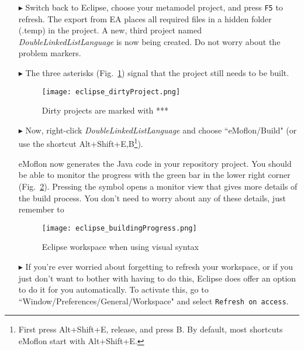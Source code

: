 \begin{itemize}
\item[$\blacktriangleright$] Switch back to Eclipse, choose your metamodel project, and press \texttt{F5} to refresh. 
The export from EA places all required files in a hidden folder (.temp) in the project.
A new, third project named \emph{DoubleLinkedListLanguage} is now being created.
Do not worry about the problem markers.

\item[$\blacktriangleright$] The three asterisks (Fig.~\ref{eclipse:dirty-project}) signal that the project still needs to be built.

\vspace{0.5cm}

\begin{figure}[htbp]
    \centering
    \texttt{[image: eclipse\_dirtyProject.png]}
    \caption{Dirty projects are marked with ***} 
    \label{eclipse:dirty-project} 
\end{figure}

\vspace{0.5cm}

\item[$\blacktriangleright$] Now, right-click \emph{DoubleLinkedListLanguage} and choose ``eMoflon/Build" (or use the shortcut Alt+Shift+E,B\footnote{First press Alt+Shift+E, release, and press B.
By default, most shortcuts eMoflon start with Alt+Shift+E.}).

eMoflon now generates the Java code in your repository project.
You should be able to monitor the progress with the green bar in the lower right corner (Fig.~\ref{eclipse:build}). Pressing the
symbol opens a monitor view that gives more details of the build process. You don't need to worry about any of these details, just remember to 


\begin{figure}[htbp]
    \centering
    \texttt{[image: eclipse\_buildingProgress.png]}
    \caption{Eclipse workspace when using visual syntax} 
    \label{eclipse:build} 
\end{figure}

\item[$\blacktriangleright$] If you're ever worried about forgetting to refresh your workspace, or if you just don't want to bother with having to do this,
Eclipse does offer an option to do it for you automatically. To activate this, go to ``Window/Preferences/General/Workspace" and select \texttt{Refresh on
access}.

\end{itemize}